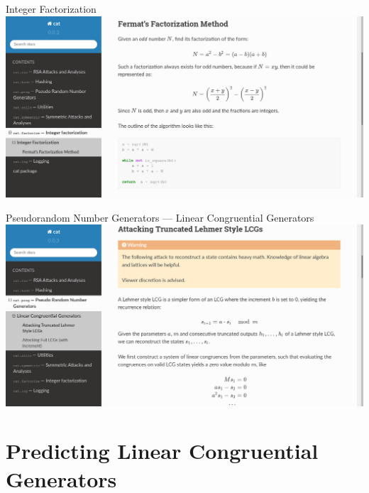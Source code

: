 \documentclass[10pt,aspectratio=169,table,usenames,dvipsnames,table]{beamer}
\begin{document}
\begin{frame}{Integer Factorization}
  \includegraphics[width=\textwidth, height=0.8\textheight, keepaspectratio]{fermat_doc.png}
\end{frame}

\begin{frame}{Pseudorandom Number Generators --- Linear Congruential Generators}
  \includegraphics[width=\textwidth, height=0.8\textheight, keepaspectratio]{lcg_doc.png}
\end{frame}

\section{Predicting Linear Congruential Generators}
\end{document}
